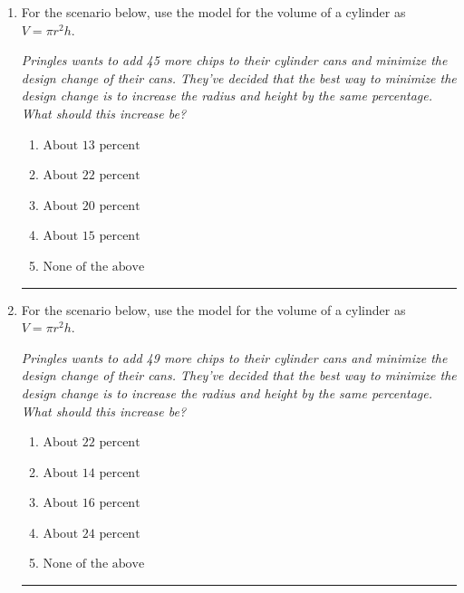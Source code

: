\documentclass[14pt]{extbook}
\newcommand{\litem}[1]{\item#1\hspace*{-1cm}\rule{\textwidth}{0.4pt}}
\begin{document}
\begin{enumerate}
{\begin{enumerate}[label=\Alph*.]
\end{enumerate} }
\litem{
For the scenario below, use the model for the volume of a cylinder as $V = \pi r^2 h$.
\begin{center}
    \textit{ Pringles wants to add 45 \text{percent} more chips to their cylinder cans and minimize the design change of their cans. They've decided that the best way to minimize the design change is to increase the radius and height by the same percentage. What should this increase be? }
\end{center}
\begin{enumerate}[label=\Alph*.]
\item \( \text{About } 13 \text{ percent} \)
\item \( \text{About } 22 \text{ percent} \)
\item \( \text{About } 20 \text{ percent} \)
\item \( \text{About } 15  \)
\item \( \text{None of the above} \)

\end{enumerate} }
\litem{
For the scenario below, use the model for the volume of a cylinder as $V = \pi r^2 h$.
\begin{center}
    \textit{ Pringles wants to add 49 \text{percent} more chips to their cylinder cans and minimize the design change of their cans. They've decided that the best way to minimize the design change is to increase the radius and height by the same percentage. What should this increase be? }
\end{center}
\begin{enumerate}[label=\Alph*.]
\item \( \text{About } 22 \text{ percent} \)
\item \( \text{About } 14 \text{ percent} \)
\item \( \text{About } 16 \text{ percent} \)
\item \( \text{About } 24 \text{ percent} \)
\item \( \text{None of the above} \)


\end{enumerate}}
\end{enumerate}
\end{document}
